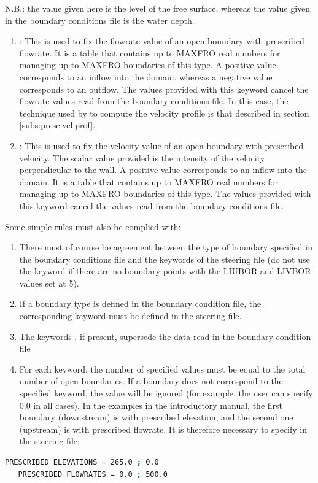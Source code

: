  N.B.: the value given here is the level of the free surface, whereas the value given in the boundary conditions file is the water depth.

\begin{enumerate}
\item  {}: This is used to fix the flowrate value of an open boundary with prescribed flowrate. It is a table that contains up to MAXFRO real numbers for managing up to MAXFRO boundaries of this type. A positive value corresponds to an inflow into the domain, whereas a negative value corresponds to an outflow. The values provided with this keyword cancel the flowrate values read from the boundary conditions file. In this case, the technique used by  to compute the velocity profile is that described in section \ref{subs:presc:vel:prof}.

\item  {}: This is used to fix the velocity value of an open boundary with prescribed velocity. The scalar value provided is the intensity of the velocity perpendicular to the wall. A positive value corresponds to an inflow into the domain. It is a table that contains up to MAXFRO real numbers for managing up to MAXFRO boundaries of this type. The values provided with this keyword cancel the values read from the boundary conditions file.
\end{enumerate}

 Some simple rules must also be complied with:

\begin{enumerate}
\item  There must of course be agreement between the type of boundary specified in the boundary conditions file and the keywords of the steering file (do not use the keyword  if there are no boundary points with the LIUBOR and LIVBOR values set at 5).

\item  If a boundary type is defined in the boundary condition file, the corresponding keyword must be defined in the steering file.

\item  The keywords , if present, supersede the data read in the boundary condition file

\item  For each keyword, the number of specified values must be equal to the total number of open boundaries. If a boundary does not correspond to the specified keyword, the value will be ignored (for example, the user can specify 0.0 in all cases). In the examples in the introductory manual, the first boundary (downstream) is with prescribed elevation, and the second one (upstream) is with prescribed flowrate. It is therefore necessary to specify in the steering file:
\end{enumerate}
\begin{lstlisting}[language=bash]
   PRESCRIBED ELEVATIONS = 265.0 ; 0.0
   PRESCRIBED FLOWRATES = 0.0 ; 500.0
\end{lstlisting}

